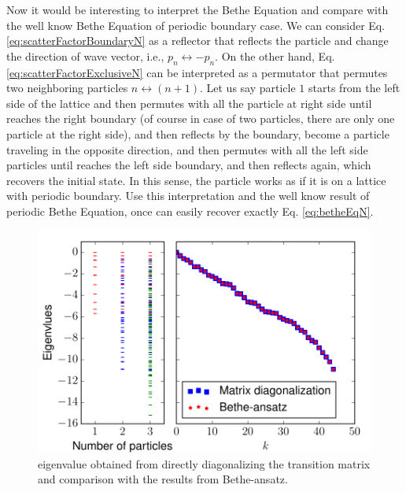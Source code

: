 \documentclass[aps,showpacs,twocolumn,floatfix,prx,superscriptaddress]{revtex4-1}
\begin{document}
Now it would be interesting to interpret the Bethe Equation and compare with the well know Bethe Equation of periodic boundary case. We can consider Eq.  \eqref{eq:scatterFactorBoundaryN} as a reflector that reflects the particle and change the direction of wave vector, i.e., $p_n\leftrightarrow-p_n$.  On the other hand, Eq. \eqref{eq:scatterFactorExclusiveN} can be interpreted as a permutator that permutes two neighboring particles $n\leftrightarrow (n+1)$.  Let us say particle $1$ starts from the left side of the lattice and then permutes with all the particle at right side until reaches the right boundary (of course in case of two particles, there are only one particle at the right side), and then reflects by the boundary, become a particle traveling in the opposite direction, and then permutes with all the left side particles until reaches the left side boundary, and then reflects again, which recovers the initial state.  In this sense, the particle works as if it is on a lattice with periodic boundary. Use this interpretation and the well know result of periodic Bethe Equation, once can easily recover exactly Eq. \eqref{eq:betheEqN}. 

\begin{figure}[htpb]
    \centering
    \includegraphics[width=1.0\linewidth]{spectrum}
    \caption{eigenvalue obtained from directly diagonalizing the transition matrix and comparison with the results from Bethe-ansatz.}
    \label{fig:spectrum}
\end{figure}



%
\end{document}
